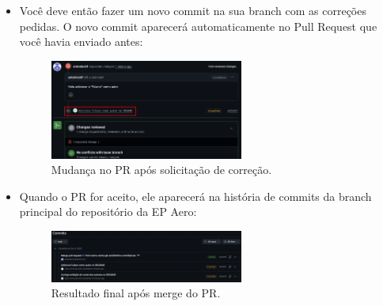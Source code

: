 \begin{itemize}
    \item Você deve então fazer um novo commit na sua branch com as correções pedidas. O novo commit aparecerá automaticamente no Pull Request que você havia enviado antes:

    \begin{figure}[H]
        \centering
        \includegraphics[width=0.6\textwidth]{imgs/tutorial_contribuicao/replica_pr.png}
        \caption{Mudança no PR após solicitação de correção.}
        \label{fig:replica_pr}
    \end{figure}

    \item Quando o PR for aceito, ele aparecerá na história de commits da branch principal do repositório da EP Aero: 

    \begin{figure}[H]
        \centering
        \includegraphics[width=0.6\textwidth]{imgs/tutorial_contribuicao/resultado_pr.png}
        \caption{Resultado final após merge do PR.}
        \label{fig:resultado_pr}
    \end{figure}
\end{itemize}